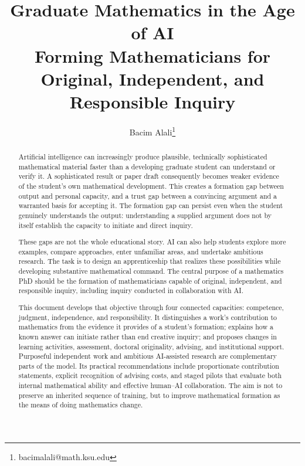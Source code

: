 \documentclass[11pt]{article}
\title{\textbf{Graduate Mathematics in the Age of AI}\\[0.35em]
\large Forming Mathematicians for Original, Independent, and Responsible Inquiry}
\author{Bacim Alali\thanks{bacimalali@math.ksu.edu}}
\date{}
\begin{document}
\maketitle

\begin{abstract}
Artificial intelligence can increasingly produce plausible, technically sophisticated
mathematical material faster than a developing graduate student can understand or verify
it. A sophisticated result or paper draft consequently becomes weaker evidence of the
student's own mathematical development. This creates a formation gap between output and
personal capacity, and a trust gap between a convincing argument and a warranted basis
for accepting it. The formation gap can persist even when the student genuinely
understands the output: understanding a supplied argument does not by itself establish
the capacity to initiate and direct inquiry.

These gaps are not the whole educational story. AI can also help students explore more
examples, compare approaches, enter unfamiliar areas, and undertake ambitious research.
The task is to design an apprenticeship that realizes these possibilities while
developing substantive mathematical command. The central purpose of a mathematics PhD
should be the formation of mathematicians capable of original, independent, and
responsible inquiry, including inquiry conducted in collaboration with AI.

This document develops that objective through four connected capacities: competence,
judgment, independence, and responsibility. It distinguishes a work's contribution to
mathematics from the evidence it provides of a student's formation; explains how a known
answer can initiate rather than end creative inquiry; and proposes changes in learning
activities, assessment, doctoral originality, advising, and institutional support.
Purposeful independent work and ambitious AI-assisted research are complementary parts
of the model. Its practical recommendations include proportionate contribution
statements, explicit recognition of advising costs, and staged pilots that evaluate
both internal mathematical ability and effective human--AI collaboration. The aim is
not to preserve an inherited sequence of training, but to improve mathematical formation
as the means of doing mathematics change.

\end{abstract}

\newpage
{\small
\tableofcontents
}
\newpage
\end{document}
